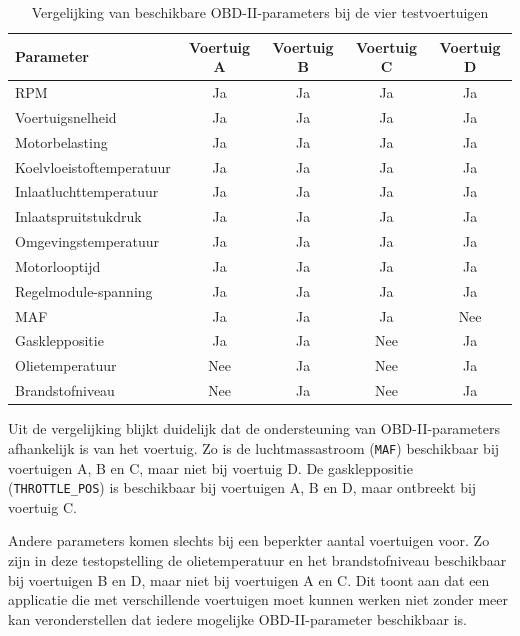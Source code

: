 \begin{table}[H]
    \centering
    \caption{Vergelijking van beschikbare OBD-II-parameters bij de vier testvoertuigen}
    \label{tab:vergelijking-obd-parameters}
    \begin{tabular}{lcccc}
        \hline
        \textbf{Parameter} &
        \textbf{Voertuig A} &
        \textbf{Voertuig B} &
        \textbf{Voertuig C} &
        \textbf{Voertuig D} \\
        \hline
        RPM                       & Ja & Ja & Ja & Ja \\
        Voertuigsnelheid          & Ja & Ja & Ja & Ja \\
        Motorbelasting            & Ja & Ja & Ja & Ja \\
        Koelvloeistoftemperatuur  & Ja & Ja & Ja & Ja \\
        Inlaatluchttemperatuur    & Ja & Ja & Ja & Ja \\
        Inlaatspruitstukdruk      & Ja & Ja & Ja & Ja \\
        Omgevingstemperatuur      & Ja & Ja & Ja & Ja \\
        Motorlooptijd             & Ja & Ja & Ja & Ja \\
        Regelmodule-spanning      & Ja & Ja & Ja & Ja \\
        MAF                       & Ja & Ja & Ja & Nee \\
        Gaskleppositie            & Ja & Ja & Nee & Ja \\
        Olietemperatuur           & Nee & Ja & Nee & Ja \\
        Brandstofniveau           & Nee & Ja & Nee & Ja \\
        \hline
    \end{tabular}
\end{table}

Uit de vergelijking blijkt duidelijk dat de ondersteuning van OBD-II-parameters
afhankelijk is van het voertuig. Zo is de luchtmassastroom
(\texttt{MAF}) beschikbaar bij voertuigen A, B en C, maar niet bij voertuig D.
De gaskleppositie (\texttt{THROTTLE\_POS}) is beschikbaar bij voertuigen A, B
en D, maar ontbreekt bij voertuig C.

Andere parameters komen slechts bij een beperkter aantal voertuigen voor. Zo
zijn in deze testopstelling de olietemperatuur en het brandstofniveau
beschikbaar bij voertuigen B en D, maar niet bij voertuigen A en C. Dit toont
aan dat een applicatie die met verschillende voertuigen moet kunnen werken niet
zonder meer kan veronderstellen dat iedere mogelijke OBD-II-parameter
beschikbaar is.


